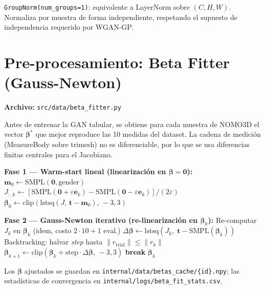 \documentclass[a4paper,11pt]{article}
\begin{document}
\texttt{GroupNorm(num\_groups=1)}: equivalente a LayerNorm sobre $(C,H,W)$.
Normaliza por muestra de forma independiente, respetando el supuesto de
independencia requerido por WGAN-GP.

\section{Pre-procesamiento: Beta Fitter (Gauss-Newton)}

\textbf{Archivo:} \texttt{src/data/beta\_fitter.py}

Antes de entrenar la GAN tabular, se obtiene para cada muestra de NOMO3D
el vector $\bm{\beta}^*$ que mejor reproduce las 10 medidas del dataset.
La cadena de medición (MeasureBody sobre trimesh) no es diferenciable, por
lo que se usa diferencias finitas centrales para el Jacobiano.

\begin{algorithm}[H]
\caption{Ajuste de $\bm{\beta}$ SMPL por Gauss-Newton}
\label{alg:gn}
\begin{algorithmic}[1]

\State \textbf{Fase 1 — Warm-start lineal (linearización en $\bm{\beta}=\bm{0}$):}
\State $\bm{m}_0 \gets \text{SMPL}(\bm{0},\text{gender})$
    \State $J_{:,k} \gets [\text{SMPL}(\bm{0}+\varepsilon\bm{e}_k) - \text{SMPL}(\bm{0}-\varepsilon\bm{e}_k)] / (2\varepsilon)$
\EndFor
\State $\bm{\beta}_0 \gets \text{clip}(\text{lstsq}(J,\, \bm{t}-\bm{m}_0),\,-3,3)$

\State \textbf{Fase 2 — Gauss-Newton iterativo (re-linearización en $\bm{\beta}_k$):}
    \State Re-computar $J_k$ en $\bm{\beta}_k$ (idem, costo $2\cdot10+1$ eval.)
    \State $\Delta\bm{\beta} \gets \text{lstsq}(J_k,\;\bm{t}-\text{SMPL}(\bm{\beta}_k))$
    \State Backtracking: halvar \textit{step} hasta $\|r_{\text{trial}}\| \le \|r_k\|$
    \State $\bm{\beta}_{k+1} \gets \text{clip}(\bm{\beta}_k + \text{step}\cdot\Delta\bm{\beta},\,-3,3)$
        \State \textbf{break}
    \EndIf
\EndFor
\State \Return $\bm{\beta}_k$
\end{algorithmic}
\end{algorithm}

Los $\bm{\beta}$ ajustados se guardan en
\texttt{internal/data/betas\_cache/\{id\}.npy}; las estadísticas de
convergencia en \texttt{internal/logs/beta\_fit\_stats.csv}.
\end{document}
